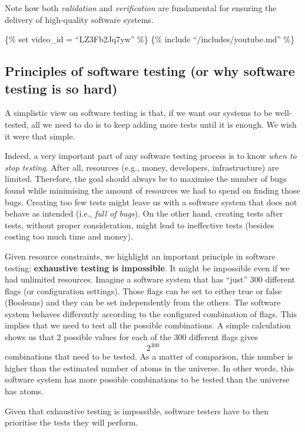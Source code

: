 Note how both \emph{validation} and \emph{verification} are fundamental
for ensuring the delivery of high-quality software systems.

\{\% set video\_id = ``LZ3Fb2Jq7yw'' \%\} \{\% include
``/includes/youtube.md'' \%\}

\hypertarget{principles-of-software-testing-or-why-software-testing-is-so-hard}{%
\subsection{Principles of software testing (or why software testing is
so
hard)}\label{principles-of-software-testing-or-why-software-testing-is-so-hard}}

A simplistic view on software testing is that, if we want our systems to
be well-tested, all we need to do is to keep adding more tests until it
is enough. We wish it were that simple.

Indeed, a very important part of any software testing process is to know
\emph{when to stop testing}. After all, resources (e.g., money,
developers, infrastructure) are limited. Therefore, the goal should
always be to maximise the number of bugs found while minimising the
amount of resources we had to spend on finding those bugs. Creating too
few tests might leave us with a software system that does not behave as
intended (i.e., \emph{full of bugs}). On the other hand, creating tests
after tests, without proper consideration, might lead to ineffective
tests (besides costing too much time and money).

Given resource constraints, we highlight an important principle in
software testing: \textbf{exhaustive testing is impossible}. It might be
impossible even if we had unlimited resources. Imagine a software system
that has ``just'' 300 different flags (or configuration settings). Those
flags can be set to either true or false (Booleans) and they can be set
independently from the others. The software system behaves differently
according to the configured combination of flags. This implies that we
need to test all the possible combinations. A simple calculation shows
us that 2 possible values for each of the 300 different flags gives
\[2^{300}\] combinations that need to be tested. As a matter of
comparison, this number is higher than the estimated number of atoms in
the universe. In other words, this software system has more possible
combinations to be tested than the universe has atoms.

Given that exhaustive testing is impossible, software testers have to
then prioritise the tests they will perform.

